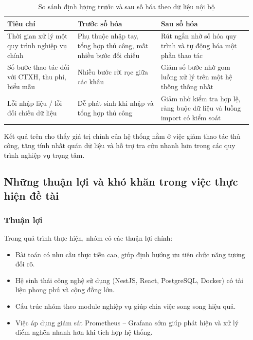 \begin{table}[H]
	\centering
	\caption{So sánh định lượng trước và sau số hóa theo dữ liệu nội bộ}
	\label{tab:chapter8-quantitative}
	\begin{tabular}{|p{4cm}|p{4cm}|p{4cm}|}
		\hline
		\textbf{Tiêu chí} & \textbf{Trước số hóa} & \textbf{Sau số hóa} \\
		\hline
		Thời gian xử lý một quy trình nghiệp vụ chính & Phụ thuộc nhập tay, tổng hợp thủ công, mất nhiều bước đối chiếu & Rút ngắn nhờ số hóa quy trình và tự động hóa một phần thao tác \\
		\hline
		Số bước thao tác đối với CTXH, thu phí, biểu mẫu & Nhiều bước rời rạc giữa các khâu & Giảm số bước nhờ gom luồng xử lý trên một hệ thống thống nhất \\
		\hline
		Lỗi nhập liệu / lỗi đối chiếu dữ liệu & Dễ phát sinh khi nhập và tổng hợp thủ công & Giảm nhờ kiểm tra hợp lệ, ràng buộc dữ liệu và luồng import có kiểm soát \\
		\hline
	\end{tabular}
\end{table}

Kết quả trên cho thấy giá trị chính của hệ thống nằm ở việc giảm thao tác thủ công, tăng tính nhất quán dữ liệu và hỗ trợ tra cứu nhanh hơn trong các quy trình nghiệp vụ trọng tâm.

\subsection{Những thuận lợi và khó khăn trong việc thực hiện đề tài}

\subsubsection{Thuận lợi}
Trong quá trình thực hiện, nhóm có các thuận lợi chính:
\begin{itemize}
	\item Bài toán có nhu cầu thực tiễn cao, giúp định hướng ưu tiên chức năng tương đối rõ.
	\item Hệ sinh thái công nghệ sử dụng (NestJS, React, PostgreSQL, Docker) có tài liệu phong phú và cộng đồng lớn.
	\item Cấu trúc nhóm theo module nghiệp vụ giúp chia việc song song hiệu quả.
	\item Việc áp dụng giám sát Prometheus -- Grafana sớm giúp phát hiện và xử lý điểm nghẽn nhanh hơn khi tích hợp hệ thống.
\end{itemize}

